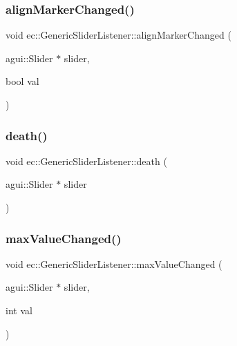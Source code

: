 \subsubsection{\texorpdfstring{align\+Marker\+Changed()}{alignMarkerChanged()}}
{\footnotesize\ttfamily void ec\+::\+Generic\+Slider\+Listener\+::align\+Marker\+Changed (\begin{DoxyParamCaption}\item[{agui\+::\+Slider $\ast$}]{slider,  }\item[{bool}]{val }\end{DoxyParamCaption})\hspace{0.3cm}{\ttfamily [override]}}

\mbox{\label{classec_1_1_generic_slider_listener_aceaad6f17199becb59205d1ac57f9a67}} 
\subsubsection{\texorpdfstring{death()}{death()}}
{\footnotesize\ttfamily void ec\+::\+Generic\+Slider\+Listener\+::death (\begin{DoxyParamCaption}\item[{agui\+::\+Slider $\ast$}]{slider }\end{DoxyParamCaption})\hspace{0.3cm}{\ttfamily [override]}}

\mbox{\label{classec_1_1_generic_slider_listener_a91d4e65dd9128321b891e01cced50237}} 
\subsubsection{\texorpdfstring{max\+Value\+Changed()}{maxValueChanged()}}
{\footnotesize\ttfamily void ec\+::\+Generic\+Slider\+Listener\+::max\+Value\+Changed (\begin{DoxyParamCaption}\item[{agui\+::\+Slider $\ast$}]{slider,  }\item[{int}]{val }\end{DoxyParamCaption})\hspace{0.3cm}{\ttfamily [override]}}

